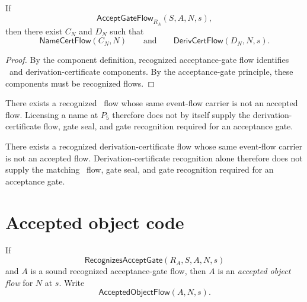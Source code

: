 \begin{theorem}
\label{thm:deriv-accept-gate-requires-namecert-derivcert}
If
$$
  \mathsf{AcceptGateFlow}_{R_A}(S,A,N,s),
$$
then there exist $C_N$ and $D_N$ such that
$$
  \mathsf{NameCertFlow}(C_N,N)
  \qquad\text{and}\qquad
  \mathsf{DerivCertFlow}(D_N,N,s).
$$
\end{theorem}

\begin{proof}
By the component definition, recognized acceptance-gate flow identifies \NameCert\ and derivation-certificate components. By the acceptance-gate principle, these components must be recognized flows.
\end{proof}

\begin{corollary}
\label{cor:deriv-accept-namecert-alone-no-gate}
There exists a recognized \NameCert\ flow whose same event-flow carrier is not an accepted flow. Licensing a name at $P_5$ therefore does not by itself supply the derivation-certificate flow, gate seal, and gate recognition required for an acceptance gate.
\end{corollary}

\begin{corollary}
\label{cor:deriv-accept-derivcert-alone-no-gate}
There exists a recognized derivation-certificate flow whose same event-flow carrier is not an accepted flow. Derivation-certificate recognition alone therefore does not supply the matching \NameCert\ flow, gate seal, and gate recognition required for an acceptance gate.
\end{corollary}

\section{Accepted object code}
\label{sec:deriv-accept-accepted-code}

\begin{definition}
\label{def:deriv-accept-accepted-object-flow}
If
$$
  \mathsf{RecognizesAcceptGate}(R_A,S,A,N,s)
$$
and $A$ is a sound recognized acceptance-gate flow, then $A$ is an \emph{accepted object flow} for $N$ at $s$. Write
$$
  \mathsf{AcceptedObjectFlow}(A,N,s).
$$
\end{definition}

